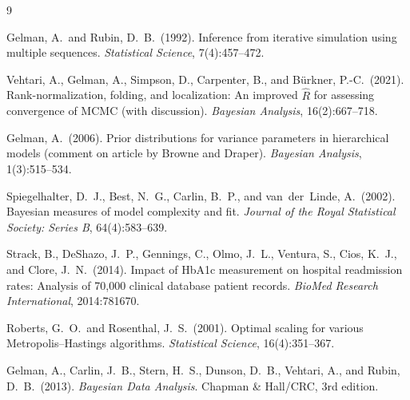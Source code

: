 \documentclass[10pt]{article}
\begin{document}
\begin{thebibliography}{9}

Gelman, A.\ and Rubin, D.~B.\ (1992).
\newblock Inference from iterative simulation using multiple sequences.
\newblock \textit{Statistical Science}, 7(4):457--472.

Vehtari, A., Gelman, A., Simpson, D., Carpenter, B., and B{\"u}rkner, P.-C.\ (2021).
\newblock Rank-normalization, folding, and localization: An improved $\hat{R}$
  for assessing convergence of {MCMC} (with discussion).
\newblock \textit{Bayesian Analysis}, 16(2):667--718.

Gelman, A.\ (2006).
\newblock Prior distributions for variance parameters in hierarchical models
  (comment on article by {Browne} and {Draper}).
\newblock \textit{Bayesian Analysis}, 1(3):515--534.

Spiegelhalter, D.~J., Best, N.~G., Carlin, B.~P., and van~der~Linde, A.\ (2002).
\newblock Bayesian measures of model complexity and fit.
\newblock \textit{Journal of the Royal Statistical Society: Series B},
  64(4):583--639.

Strack, B., DeShazo, J.~P., Gennings, C., Olmo, J.~L., Ventura, S.,
  Cios, K.~J., and Clore, J.~N.\ (2014).
\newblock Impact of {HbA1c} measurement on hospital readmission rates:
  Analysis of 70,000 clinical database patient records.
\newblock \textit{BioMed Research International}, 2014:781670.

Roberts, G.~O.\ and Rosenthal, J.~S.\ (2001).
\newblock Optimal scaling for various {Metropolis--Hastings} algorithms.
\newblock \textit{Statistical Science}, 16(4):351--367.

Gelman, A., Carlin, J.~B., Stern, H.~S., Dunson, D.~B., Vehtari, A.,
  and Rubin, D.~B.\ (2013).
\newblock \textit{Bayesian Data Analysis}.
\newblock Chapman \& Hall/CRC, 3rd edition.

\end{thebibliography}
\end{document}
